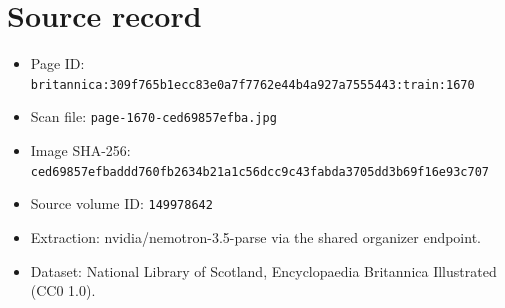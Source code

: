 \documentclass{article}
\begin{document}
\section*{Source record}
\begin{itemize}
\item Page ID: \texttt{britannica:309f765b1ecc83e0a7f7762e44b4a927a7555443:train:1670}
\item Scan file: \texttt{page-1670-ced69857efba.jpg}
\item Image SHA-256: \texttt{ced69857efbaddd760fb2634b21a1c56dcc9c43fabda3705dd3b69f16e93c707}
\item Source volume ID: \texttt{149978642}
\item Extraction: nvidia/nemotron-3.5-parse via the shared organizer endpoint.
\item Dataset: National Library of Scotland, Encyclopaedia Britannica Illustrated (CC0 1.0).
\end{itemize}
\end{document}
